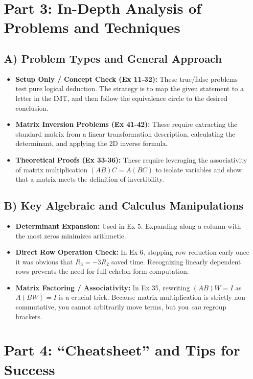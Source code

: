 \documentclass[11pt]{article}
\begin{document}
\section*{Part 3: In-Depth Analysis of Problems and Techniques}

\subsection*{A) Problem Types and General Approach}
\begin{itemize}
    \item \textbf{Setup Only / Concept Check (Ex 11-32):} These true/false problems test pure logical deduction. The strategy is to map the given statement to a letter in the IMT, and then follow the equivalence circle to the desired conclusion.
    \item \textbf{Matrix Inversion Problems (Ex 41-42):} These require extracting the standard matrix from a linear transformation description, calculating the determinant, and applying the 2D inverse formula.
    \item \textbf{Theoretical Proofs (Ex 33-36):} These require leveraging the associativity of matrix multiplication $(AB)C = A(BC)$ to isolate variables and show that a matrix meets the definition of invertibility.
\end{itemize}

\subsection*{B) Key Algebraic and Calculus Manipulations}
\begin{itemize}
    \item \textbf{Determinant Expansion:} Used in Ex 5. Expanding along a column with the most zeros minimizes arithmetic. 
    \item \textbf{Direct Row Operation Check:} In Ex 6, stopping row reduction early once it was obvious that $R_3 = -3R_2$ saved time. Recognizing linearly dependent rows prevents the need for full echelon form computation.
    \item \textbf{Matrix Factoring / Associativity:} In Ex 35, rewriting $(AB)W = I$ as $A(BW) = I$ is a crucial trick. Because matrix multiplication is strictly non-commutative, you cannot arbitrarily move terms, but you \textit{can} regroup brackets.
\end{itemize}

\section*{Part 4: ``Cheatsheet'' and Tips for Success}
\end{document}
